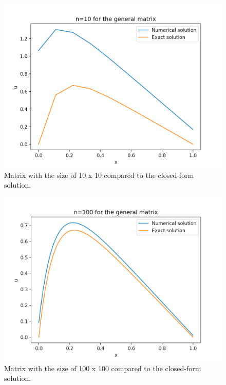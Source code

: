 \documentclass[%
oneside,                 %
final,                   %
10pt]{article}
\begin{document}
\begin{figure}[H]
  \includegraphics[scale=0.5]{figur1b_10.png}
  \centering
  \caption{Matrix with the size of 10 x 10 compared to the closed-form solution.}
  \label{1b_10}
\end{figure}
\begin{figure}[H]
  \includegraphics[scale=0.5]{figur1b_100.png}
  \caption{Matrix with the size of 100 x 100 compared to the closed-form solution.}
  \label{1b_100}
\end{figure}
\end{document}
